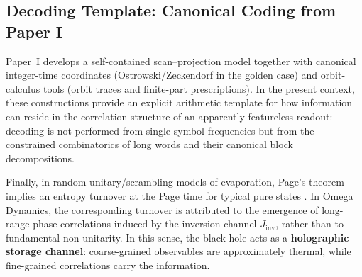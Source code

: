 \subsection{Decoding Template: Canonical Coding from Paper I}
Paper~I \cite{Ma2025HPA} develops a self-contained scan--projection model together with canonical integer-time coordinates (Ostrowski/Zeckendorf in the golden case) and orbit-calculus tools (orbit traces and finite-part prescriptions). In the present context, these constructions provide an explicit arithmetic template for how information can reside in the correlation structure of an apparently featureless readout: decoding is not performed from single-symbol frequencies but from the constrained combinatorics of long words and their canonical block decompositions.

Finally, in random-unitary/scrambling models of evaporation, Page's theorem implies an entropy turnover at the Page time for typical pure states \cite{Page1993, HaydenPreskill2007}. In Omega Dynamics, the corresponding turnover is attributed to the emergence of long-range phase correlations induced by the inversion channel $J_{\mathrm{inv}}$, rather than to fundamental non-unitarity.
In this sense, the black hole acts as a \textbf{holographic storage channel}: coarse-grained observables are approximately thermal, while fine-grained correlations carry the information.
